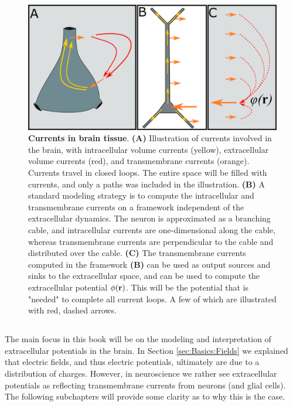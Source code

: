 \begin{figure}[!ht]
\begin{center}
\includegraphics[width=1.0\textwidth]{Figures/Basics/Twostep.png}
\end{center}
\caption{{\bf Currents in brain tissue}. {\bf(A)} Illustration of currents involved in the brain, with intracellular volume currents (yellow), extracellular volume currents (red), and transmembrane currents (orange). Currents travel in closed loops. The entire space will be filled with currents, and only a paths was included in the illustration. {\bf(B)} A standard modeling strategy is to compute the intracellular and transmembrane currents on a framework independent of the extracellular dynamics. The neuron is approximated as a branching cable, and intracellular currents are one-dimensional along the cable, whereas transmembrane currents are perpendicular to the cable and distributed over the cable. {\bf(C)} The transmembrane currents computed in the framework {\bf(B)} can be used as output sources and sinks to the extracellular space, and can be used to compute the extracellular potential $\phi({\bf r})$. This will be the potential that is "needed" to complete all current loops. A few of which are illustrated with red, dashed arrows. 
}
\label{Basics:fig:Twostep}
\end{figure}


\subsection{}
\label{sec:Basics:ECSpot}
The main focus in this book will be on the modeling and interpretation of extracellular potentials in the brain. In Section \ref{sec:Basics:Fields} we explained that electric fields, and thus electric potentials, ultimately are due to a distribution of charges. However, in neuroscience we rather see extracellular potentials as reflecting transmembrane currents from neurons (and glial cells). The following subchapters will provide some clarity as to why this is the case. 


